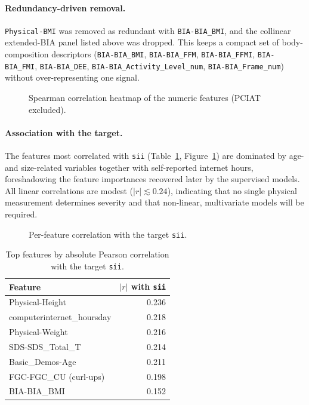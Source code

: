 \paragraph{Redundancy-driven removal.} \texttt{Physical-BMI} was removed as redundant with \texttt{BIA-BIA\_BMI}, and the collinear extended-BIA panel listed above was dropped. This keeps a compact set of body-composition descriptors (\texttt{BIA-BIA\_BMI}, \texttt{BIA-BIA\_FFM}, \texttt{BIA-BIA\_FFMI}, \texttt{BIA-BIA\_FMI}, \texttt{BIA-BIA\_DEE}, \texttt{BIA-BIA\_Activity\_Level\_num}, \texttt{BIA-BIA\_Frame\_num}) without over-representing one signal.\\

\begin{figure}[h]
    \centering
    \caption{Spearman correlation heatmap of the numeric features (PCIAT excluded).}
    \label{fig:cmi_heatmap}
\end{figure}

\paragraph{Association with the target.} The features most correlated with \texttt{sii} (Table~\ref{tab:cmi_corr}, Figure~\ref{fig:cmi_heatmap}) are dominated by age- and size-related variables together with self-reported internet hours, foreshadowing the feature importances recovered later by the supervised models. All linear correlations are modest ($|r|\lesssim 0.24$), indicating that no single physical measurement determines severity and that non-linear, multivariate models will be required.

\begin{figure}[h]
    \centering
    \caption{Per-feature correlation with the target \texttt{sii}.}
    \label{fig:cmi_corr_bar}
\end{figure}

\begin{table}[H]
\centering
\caption{Top features by absolute Pearson correlation with the target \texttt{sii}.}
\label{tab:cmi_corr}
\begin{tabular}{l r}
\hline
Feature & $|r|$ with \texttt{sii} \\
\hline
Physical-Height & 0.236 \\
computerinternet\_hoursday & 0.218 \\
Physical-Weight & 0.216 \\
SDS-SDS\_Total\_T & 0.214 \\
Basic\_Demos-Age & 0.211 \\
FGC-FGC\_CU (curl-ups) & 0.198 \\
BIA-BIA\_BMI & 0.152 \\
\hline
\end{tabular}
\end{table}

